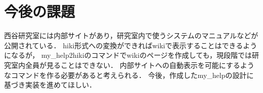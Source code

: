 \section{今後の課題}
西谷研究室には内部サイトがあり，研究室内で使うシステムのマニュアルなどが公開されている．
hiki形式への変換ができればwikiで表示することはできるようになるが，
my\_help2hikiのコマンドでwikiのページを作成しても，現段階では研究室内全員が見ることはできない．
内部サイトへの自動表示を可能にするようなコマンドを作る必要があると考えられる．
今後，作成したmy\_helpの設計に基づき実装を進めてほしい．
